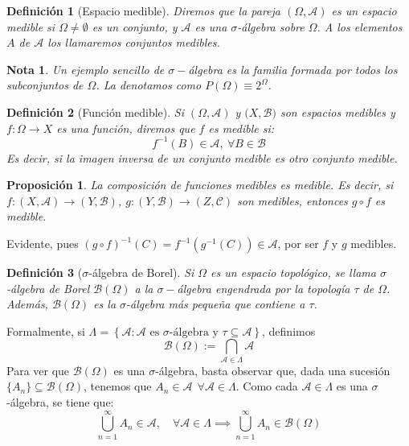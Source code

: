 \documentclass[11pt, a4paper]{article}
\makeatletter
\newif\IfInSansMode
\let\oldsf\sffamily
\renewcommand*{\sffamily}{\oldsf\mathversion{sans}\InSansModetrue}
\let\oldnorm\normalfont
\renewcommand*{\normalfont}{\oldnorm\InSansModefalse\mathversion{normal}}
\renewenvironment{proof}[1][\proofname] {\par\pushQED{\qed}\normalfont\topsep6\p@\@plus6\p@\relax\trivlist\item[\hskip\labelsep\itshape\sffamily#1\@addpunct{.}]\ignorespaces}{\popQED\endtrivlist\@endpefalse}
\theoremstyle{theorem-style}
\newtheorem{nprop}{Proposición}[section]
\theoremstyle{definition-style}
\newtheorem{ndef}{Definición}[section]
\theoremstyle{remark-style}
\newtheorem*{nota}{Nota}
\theoremstyle{example-style}
\makeatother
\begin{document}
\begin{ndef}[Espacio medible] Diremos que la pareja $(\Omega, \mathscr A)$ es un espacio medible si $\Omega \ne \emptyset$ es un conjunto, y $\mathscr A$ es una $\sigma$-álgebra sobre $\Omega$. A los elementos $A$ de $\mathscr A$ los llamaremos conjuntos medibles.
\end{ndef}

\begin{nota}
  Un ejemplo sencillo de $\sigma-$álgebra es la familia formada por todos los subconjuntos de $\Omega$. La denotamos como $P(\Omega) \equiv 2^\Omega$.
\end{nota}

\begin{ndef}[Función medible]
  Si $(\Omega,\mathscr A) $ y $(X,\mathcal{B)}$ son espacios medibles y \mbox{$f: \Omega \to X$} es una función, diremos que $f$ es medible si:
  \[
    f^{-1}(B) \in \mathscr A, \ \forall B \in \mathcal{B}
  \]
  Es decir, si la imagen inversa de un conjunto medible es otro conjunto medible.
\end{ndef}

\begin{nprop} La composición de funciones medibles es medible. Es decir, si\\ \mbox{$f:(X,\mathscr A) \longrightarrow (Y,\mathcal B)$}, $g:(Y,\mathcal B) \longrightarrow (Z,\mathcal C)$ son medibles, entonces $g\circ f$ es medible.
\end{nprop}

	\begin{proof}
	Evidente, pues $(g\circ f)^{-1}(C) = f^{-1}(g^{-1}(C)) \in \mathscr A$, por ser $f$ y $g$ medibles.
\end{proof}

\begin{ndef}[$\sigma$-álgebra de Borel] Si $\Omega$ es un espacio topológico, se llama $\sigma$-álgebra de Borel $\mathcal B(\Omega)$ a la $\sigma-$álgebra engendrada por la topología $\tau$ de $\Omega$. Además, $\mathcal B(\Omega)$ es la $\sigma$-álgebra más pequeña que contiene a $\tau$.
\end{ndef}

Formalmente, si $\Lambda = \left\{ \mathscr A : \mathscr A \text{ es } \sigma \text{-álgebra y } \tau \subseteq \mathscr A \right\}$, definimos $$\mathcal B(\Omega) := \bigcap_{\mathscr A \in \Lambda} \mathscr A$$ 
Para ver que $\mathcal B(\Omega)$ es una $\sigma$-álgebra, basta observar que, dada una sucesión \mbox{$\{A_n\} \subseteq \mathcal B(\Omega)$}, tenemos que $A_n \in \mathscr A \ \ \forall \mathscr A \in \Lambda$. Como cada $\mathscr A \in \Lambda$ es una $\sigma$-álgebra, se tiene que: $$\bigcup_{n=1}^\infty A_n \in \mathscr A, \quad \forall \mathscr A \in \Lambda \implies \bigcup_{n=1}^\infty A_n \in \mathcal B(\Omega)$$
\end{document}
